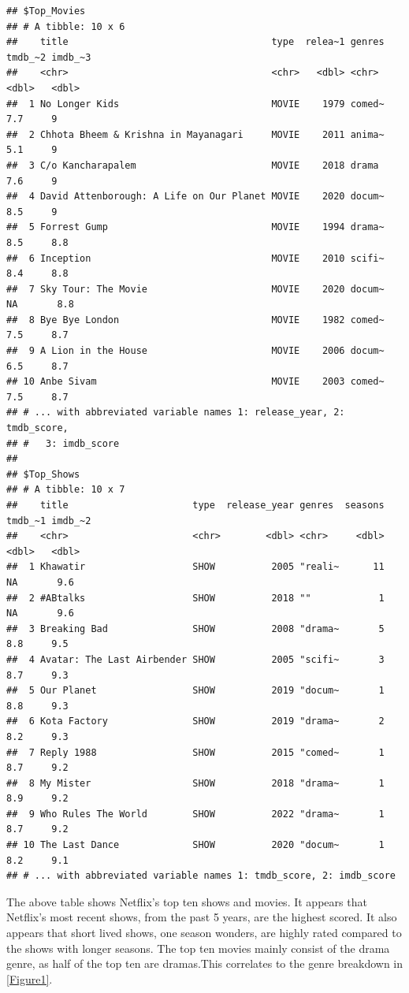 \documentclass[11pt,preprint, authoryear]{elsarticle}
\numberwithin{equation}{section}
\numberwithin{figure}{section}
\numberwithin{table}{section}
\begin{document}
\begin{verbatim}
## $Top_Movies
## # A tibble: 10 x 6
##    title                                    type  relea~1 genres tmdb_~2 imdb_~3
##    <chr>                                    <chr>   <dbl> <chr>    <dbl>   <dbl>
##  1 No Longer Kids                           MOVIE    1979 comed~     7.7     9  
##  2 Chhota Bheem & Krishna in Mayanagari     MOVIE    2011 anima~     5.1     9  
##  3 C/o Kancharapalem                        MOVIE    2018 drama      7.6     9  
##  4 David Attenborough: A Life on Our Planet MOVIE    2020 docum~     8.5     9  
##  5 Forrest Gump                             MOVIE    1994 drama~     8.5     8.8
##  6 Inception                                MOVIE    2010 scifi~     8.4     8.8
##  7 Sky Tour: The Movie                      MOVIE    2020 docum~    NA       8.8
##  8 Bye Bye London                           MOVIE    1982 comed~     7.5     8.7
##  9 A Lion in the House                      MOVIE    2006 docum~     6.5     8.7
## 10 Anbe Sivam                               MOVIE    2003 comed~     7.5     8.7
## # ... with abbreviated variable names 1: release_year, 2: tmdb_score,
## #   3: imdb_score
## 
## $Top_Shows
## # A tibble: 10 x 7
##    title                      type  release_year genres  seasons tmdb_~1 imdb_~2
##    <chr>                      <chr>        <dbl> <chr>     <dbl>   <dbl>   <dbl>
##  1 Khawatir                   SHOW          2005 "reali~      11    NA       9.6
##  2 #ABtalks                   SHOW          2018 ""            1    NA       9.6
##  3 Breaking Bad               SHOW          2008 "drama~       5     8.8     9.5
##  4 Avatar: The Last Airbender SHOW          2005 "scifi~       3     8.7     9.3
##  5 Our Planet                 SHOW          2019 "docum~       1     8.8     9.3
##  6 Kota Factory               SHOW          2019 "drama~       2     8.2     9.3
##  7 Reply 1988                 SHOW          2015 "comed~       1     8.7     9.2
##  8 My Mister                  SHOW          2018 "drama~       1     8.9     9.2
##  9 Who Rules The World        SHOW          2022 "drama~       1     8.7     9.2
## 10 The Last Dance             SHOW          2020 "docum~       1     8.2     9.1
## # ... with abbreviated variable names 1: tmdb_score, 2: imdb_score
\end{verbatim}

The above table shows Netflix's top ten shows and movies. It appears
that Netflix's most recent shows, from the past 5 years, are the highest
scored. It also appears that short lived shows, one season wonders, are
highly rated compared to the shows with longer seasons. The top ten
movies mainly consist of the drama genre, as half of the top ten are
dramas.This correlates to the genre breakdown in \ref{Figure1}.
\end{document}
